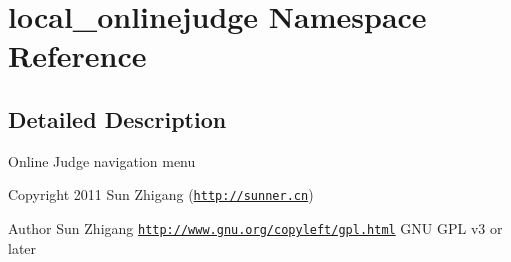 \hypertarget{namespacelocal__onlinejudge}{\section{local\-\_\-onlinejudge Namespace Reference}
\label{namespacelocal__onlinejudge}
}


\subsection{Detailed Description}
Online Judge navigation menu

\begin{DoxyCopyright}{Copyright}
2011 Sun Zhigang (\href{http://sunner.cn}{\tt http\-://sunner.\-cn}) 
\end{DoxyCopyright}
\begin{DoxyAuthor}{Author}
Sun Zhigang  \href{http://www.gnu.org/copyleft/gpl.html}{\tt http\-://www.\-gnu.\-org/copyleft/gpl.\-html} G\-N\-U G\-P\-L v3 or later 
\end{DoxyAuthor}
